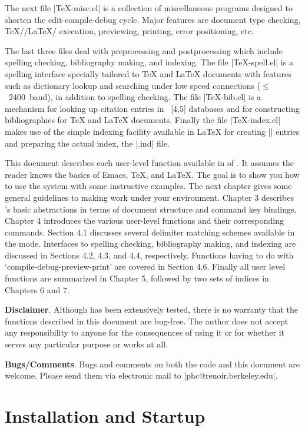 The next file |TeX-misc.el| is a collection of miscellaneous
programs designed to shorten the edit-compile-debug cycle.
Major features are document type checking,  
{\TeX}/{\AmSTeX}/{\LaTeX}/{\SliTeX} execution, previewing, printing,
error positioning, etc.

The last three files deal with preprocessing and postprocessing which include
spelling checking, bibliography making, and indexing.
The file |TeX-spell.el| is a spelling interface specially
tailored to {\TeX} and {\LaTeX} documents with features such as dictionary 
lookup and searching under low speed connections \hbox{($\leq$ 2400 baud),}
in addition to spelling checking.  The file
|TeX-bib.el| is a mechanism for looking up citation entries in
{\BibTeX}~[4,5]
databases and for constructing bibliographies for {\TeX} and {\LaTeX} 
documents.  Finally the file |TeX-index.el| makes use of the simple
indexing facility available in {\LaTeX} for creating |\index| entries
and preparing the actual index, the |.ind| file.

This document describes each user-level function available
in {\version} of {\TM}.  
It assumes the reader knows the basics of Emacs, {\TeX}, and {\LaTeX}.
The goal is to show you how to use the system with some instructive examples.
The next chapter gives some general guidelines to making
{\TM} work under your environment.  Chapter 3 describes {\TM}'s basic
abstractions in terms of document structure and command key bindings.
Chapter 4 introduces the various user-level functions and their corresponding
commands.
Section 4.1 discusses several delimiter matching schemes available in the mode.
Interfaces to spelling checking, bibliography making, and indexing
are discussed in Sections 4.2, 4.3, and 4.4, respectively.
Functions having to do with `compile-debug-preview-print' are covered in
Section 4.6.
Finally all user level functions are summarized in Chapter 5,
followed by two sets of indices in Chapters 6 and 7.

{\bf Disclaimer}.  Although {\TM} has been extensively tested,
there is no warranty that the functions described in this document
are bug-free.  The author does not accept any responsibility to anyone
for the consequences of using it or for whether it serves any particular
purpose or works at all.

{\bf Bugs/Comments}.  Bugs and comments on both the code and this
document are welcome.  Please send them via electronic mail to
|phc@renoir.berkeley.edu|.


\chapter{Installation and Startup}

